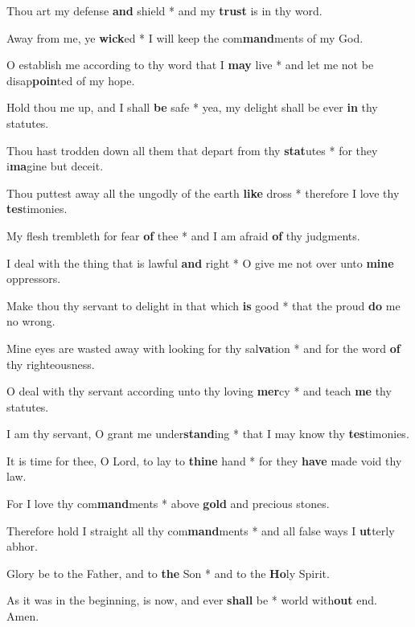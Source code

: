 \begin{multicols}{2}
	Thou art my defense \textbf{and} shield * and my \textbf{trust} is in thy word.
	
	Away from me, ye \textbf{wick}ed * I will keep the com\textbf{mand}ments of my God.
	
	O establish me according to thy word that I \textbf{may} live * and let me not be disap\textbf{poin}ted of my hope.
	
	Hold thou me up, and I shall \textbf{be} safe * yea, my delight shall be ever \textbf{in} thy statutes.
	
	Thou hast trodden down all them that depart from thy \textbf{stat}utes * for they i\textbf{ma}gine but deceit.
	
	Thou puttest away all the ungodly of the earth \textbf{like} dross * therefore I love thy \textbf{tes}timonies.
	
	My flesh trembleth for fear \textbf{of} thee * and I am afraid \textbf{of} thy judgments.
	
	I deal with the thing that is lawful \textbf{and} right * O give me not over unto \textbf{mine} oppressors.
	
	Make thou thy servant to delight in that which \textbf{is} good * that the proud \textbf{do} me no wrong.
	
	Mine eyes are wasted away with looking for thy sal\textbf{va}tion * and for the word \textbf{of} thy righteousness.
	
	O deal with thy servant according unto thy loving \textbf{mer}cy * and teach \textbf{me} thy statutes.
	
	I am thy servant, O grant me under\textbf{stand}ing * that I may know thy \textbf{tes}timonies.
	
	It is time for thee, O Lord, to lay to \textbf{thine} hand * for they \textbf{have} made void thy law.
	
	For I love thy com\textbf{mand}ments * above \textbf{gold} and precious stones.
	
	Therefore hold I straight all thy com\textbf{mand}ments * and all false ways I \textbf{ut}terly abhor. 
	
	Glory be to the Father, and to \textbf{the} Son * and to the \textbf{Ho}ly Spirit.
	
	As it was in the beginning, is now, and ever \textbf{shall} be * world with\textbf{out} end. Amen.
\end{multicols}